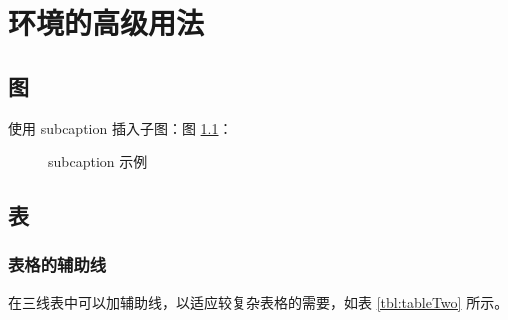 \cleardoublepage
\chapter{环境的高级用法}

\section{图}

使用 subcaption 插入子图：图 \ref{fig:subcaptionExample}：

\begin{figure}[htbp]
    \centering
        \hfill
        \hfill
    \caption{subcaption 示例}
    \label{fig:subcaptionExample}
\end{figure}


\section{表}

\subsection{表格的辅助线}
在三线表中可以加辅助线，以适应较复杂表格的需要，如表 \ref{tbl:tableTwo} 所示。

